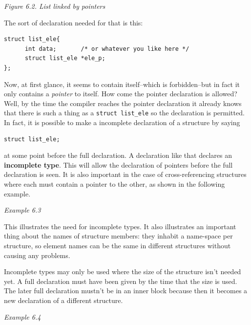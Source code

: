 \begin{center}\textit{Figure 6.2. List linked by pointers}\end{center}


   The sort of declaration needed for that is this:


   \begin{Verbatim}
struct list_ele{
      int data;       /* or whatever you like here */
      struct list_ele *ele_p;
};
\end{Verbatim}

   Now, at first glance, it seems to contain itself--which is
    forbidden--but in fact it only contains a \textit{pointer} to itself.
    How come the pointer declaration is allowed? Well, by the time the compiler
    reaches the pointer declaration it already knows that there is such a thing
    as a \texttt{struct list\_ele} so the declaration is permitted. In fact,
    it is possible to make a incomplete declaration of a structure by
    saying


   \begin{Verbatim}
struct list_ele;
\end{Verbatim}

   at some point before the full declaration. A declaration like that
    declares an \textbf{incomplete type}. This will allow the declaration of
    pointers before the full declaration is seen. It is also important in the
    case of cross-referencing structures where each must contain a pointer to
    the other, as shown in the following example.


   \begin{center}\textit{Example 6.3}\end{center}


   This illustrates the need for incomplete types. It also illustrates an
    important thing about the names of structure members: they inhabit
    a name-space per structure, so element names can be the same in different
    structures without causing any problems.


   Incomplete types may only be used where the size of the structure isn't
    needed yet. A full declaration must have been given by the time that the
    size is used. The later full declaration mustn't be in an inner block
    because then it becomes a new declaration of a different structure.


   \begin{center}\textit{Example 6.4}\end{center}


